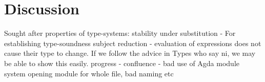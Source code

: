 \chapter{Discussion}


Sought after properties of type-systems:
stability under substitution -
For establishing type-soundness
subject reduction - evaluation of expressions does not cause their
type to change. If we follow the advice in \cite{TypesWhoSayNi} Types
who say ni, we may be able to show this easily.
progress -
confluence - 
bad use of Agda module system
   opening module for whole file, bad naming etc
